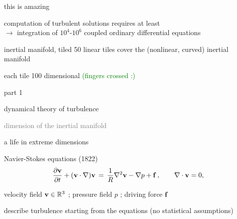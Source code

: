 \begin{frame}{this is amazing}
            \begin{block}{computation of turbulent solutions}
requires at least
\\
$\to$ integration of  $10^4$-$10^6$ coupled ordinary differential equations
            \end{block}

\bigskip

\begin{block}{inertial manifold, tiled}
50 linear tiles cover the (nonlinear, curved) inertial manifold

\medskip

each tile 100 dimensional \hfill \textcolor{green}{\small (fingers crossed :)}
            \end{block}
\end{frame}


\begin{frame}{part 1}
\begin{enumerate}
              \item {\Large
dynamical theory of turbulence
                  }\textcolor{gray}{\small
              \item
\statesp
             \item
dimension of the inertial manifold
                    }
            \end{enumerate}
\end{frame}


\begin{frame}{a life in extreme dimensions}
\begin{block}{Navier-Stokes equations (1822)}
\[
\dfrac{\partial {\bf v}}{\partial t} + ({\bf v} \cdot \nabla) {\bf v}
	\,=\,
\frac{1}{R} \nabla ^2 {\bf v}
-\nabla p
+ \mathbf{f}
    \,,\qquad
\nabla \cdot {\bf v} = 0,
\]
\end{block}

\hfill{\small
velocity field  ${\bf v} \in \mathbb{R}^3$
;
pressure field $p$
;
driving force $\mathbf{f}$
        }

\medskip

\begin{block}{describe turbulence}
starting from the equations (no statistical assumptions)
\end{block}

\bigskip

\hfill {\Large\textcolor{red}{}}

\end{frame}

